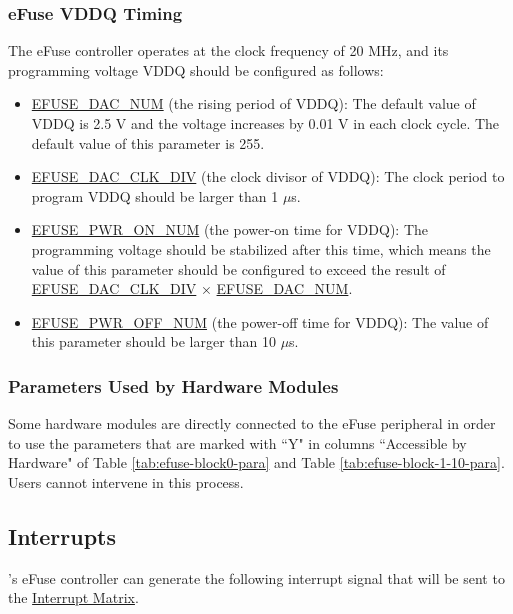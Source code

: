 \documentclass[main\_\_EN.tex]{subfiles}
\begin{document}
\subsubsection{eFuse VDDQ Timing}
\label{sec:efuse-vddq-timing}

The eFuse controller operates at the clock frequency of 20 MHz, and its programming voltage VDDQ should be configured as follows: 

\begin{itemize}
    \item \hyperref[fielddesc:EFUSEDACNUM]{EFUSE\_DAC\_NUM} (the rising period of VDDQ): The default value of VDDQ is 2.5 V and the voltage increases by 0.01 V in each clock cycle. The default value of this parameter is 255.
    \item \hyperref[fielddesc:EFUSEDACCLKDIV]{EFUSE\_DAC\_CLK\_DIV} (the clock divisor of VDDQ): The clock period to program VDDQ should be larger than 1 $\mu$s.
    \item \hyperref[fielddesc:EFUSEPWRONNUM]{EFUSE\_PWR\_ON\_NUM} (the power-on time for VDDQ): The programming voltage should be stabilized after this time, which means the value of this parameter should be configured to exceed the result of \hyperref[fielddesc:EFUSEDACCLKDIV] {EFUSE\_DAC\_CLK\_DIV} × \hyperref[fielddesc:EFUSEDACNUM]{EFUSE\_DAC\_NUM}.
    \item \hyperref[fielddesc:EFUSEPWROFFNUM]{EFUSE\_PWR\_OFF\_NUM} (the power-off time for VDDQ): The value of this parameter should be larger than 10 $\mu$s.
\end{itemize}



\subsubsection{Parameters Used by Hardware Modules}

Some hardware modules are directly connected to the eFuse peripheral in order to use the parameters that are marked with ``Y" in columns ``Accessible by Hardware" of Table \ref{tab:efuse-block0-para} and Table \ref{tab:efuse-block-1-10-para}. Users cannot intervene in this process.

\subsection{Interrupts}

\chipname{}'s eFuse controller can generate the following interrupt signal that will be sent to the \href{mod:intmtrx}{Interrupt Matrix}.
\end{document}
